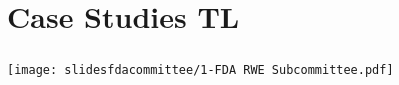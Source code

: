 \documentclass[t]{beamer}
\begin{document}




\section{Case Studies  TL}

\begin{frame}
\frametitle{}
\vspace{20pt}
\begin{center}
\texttt{[image: slidesfdacommittee/1-FDA RWE Subcommittee.pdf]}
\end{center}
\vspace{35pt}
\end{frame}
\end{document}
